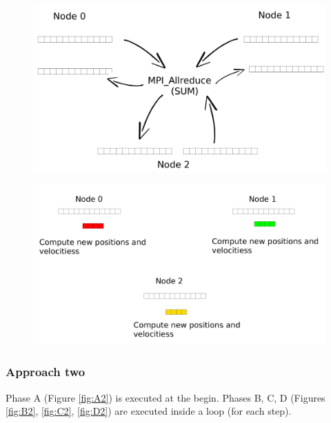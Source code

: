 \documentclass[a4paper]{article}
\begin{document}
\begin{figure}
\centering
\begin{minipage}{.5\textwidth}
  \centering
  \includegraphics[width=1\linewidth]{MPI_all_reduce}
  \label{fig:D1}
\end{minipage}%
\begin{minipage}{.5\textwidth}
  \centering
  \includegraphics[width=1\linewidth]{compute_positions_only}
  \label{fig:E1}
\end{minipage}
\end{figure}
\FloatBarrier

\subsubsection{Approach two}
\label{sec:app_1}

Phase A (Figure \ref{fig:A2}) is executed at the begin. Phases B, C, D (Figures \ref{fig:B2}, \ref{fig:C2}, \ref{fig:D2}) are executed inside a loop (for each step).
\end{document}
